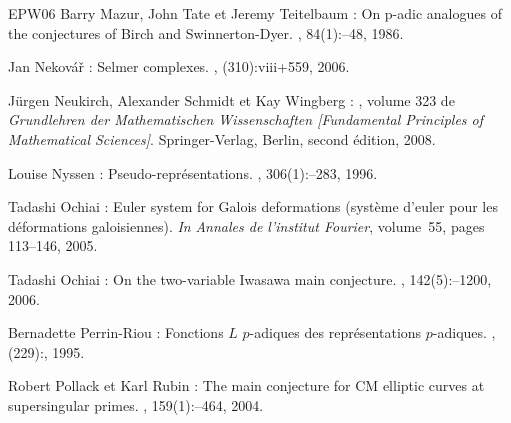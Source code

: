 \documentclass[12pt]{amsart}
\theoremstyle{defstyle}
\theoremstyle{thmstyle}
\begin{document}
\begin{thebibliography}{EPW06}
Barry \bgroup\fonteauteurs\bgroup Mazur\egroup\egroup{}, John
  \bgroup\fonteauteurs\bgroup Tate\egroup\egroup{} et Jeremy
  \bgroup\fonteauteurs\bgroup Teitelbaum\egroup\egroup{} :
\newblock On p-adic analogues of the conjectures of {B}irch and
  {S}winnerton-{D}yer.
, 84(1)\string:--48,
  1986.

Jan \bgroup\fonteauteurs\bgroup Nekov\'{a}\v{r}\egroup\egroup{} :
\newblock Selmer complexes.
, (310)\string:\relax viii+559, 2006.

J\"{u}rgen \bgroup\fonteauteurs\bgroup Neukirch\egroup\egroup{}, Alexander
  \bgroup\fonteauteurs\bgroup Schmidt\egroup\egroup{} et Kay
  \bgroup\fonteauteurs\bgroup Wingberg\egroup\egroup{} :
, volume 323 de {\em Grundlehren der
  Mathematischen Wissenschaften [Fundamental Principles of Mathematical
  Sciences]}.
\newblock Springer-Verlag, Berlin, second \'edition, 2008.

Louise \bgroup\fonteauteurs\bgroup Nyssen\egroup\egroup{} :
\newblock Pseudo-repr{\'e}sentations.
, 306(1)\string:--283, 1996.

Tadashi \bgroup\fonteauteurs\bgroup Ochiai\egroup\egroup{} :
\newblock Euler system for {G}alois deformations (syst{\`e}me d'euler pour les
  d{\'e}formations galoisiennes).
\newblock \emph{In} {\em Annales de l'institut Fourier}, volume~55, pages
  113--146, 2005.

Tadashi \bgroup\fonteauteurs\bgroup Ochiai\egroup\egroup{} :
\newblock On the two-variable {I}wasawa main conjecture.
, 142(5)\string:--1200, 2006.

Bernadette \bgroup\fonteauteurs\bgroup Perrin-Riou\egroup\egroup{} :
\newblock Fonctions {$L$} {$p$}-adiques des repr\'{e}sentations {$p$}-adiques.
, (229)\string:, 1995.

Robert \bgroup\fonteauteurs\bgroup Pollack\egroup\egroup{} et Karl
  \bgroup\fonteauteurs\bgroup Rubin\egroup\egroup{} :
\newblock The main conjecture for {CM} elliptic curves at supersingular primes.
, 159(1)\string:--464,
  2004.


\end{thebibliography}
\end{document}
